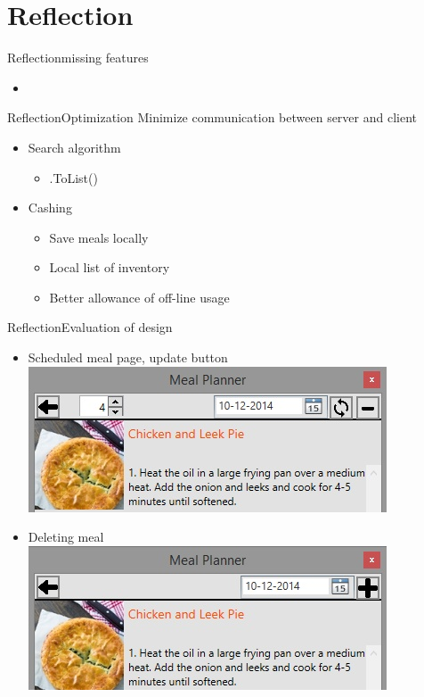 \section{Reflection}

\begin{frame}{Reflection}{missing features}%
	\begin{itemize}
		\item
	\end{itemize}
\end{frame}

\begin{frame}{Reflection}{Optimization}
	Minimize communication between server and client
	\begin{itemize}
		\item Search algorithm
		\begin{itemize}
			\item .ToList()
		\end{itemize}
		\item Cashing
		\begin{itemize}
			\item Save meals locally
			\item Local list of inventory
			\item Better allowance of off-line usage
		\end{itemize}
	\end{itemize}
\end{frame}

\begin{frame}{Reflection}{Evaluation of design}
	\begin{itemize}
		\item Scheduled meal page, update button
		\newline \includegraphics[scale=0.4]{./graphics/datepicker}
		\item Deleting meal
		\newline \includegraphics[scale=0.4]{./graphics/datepickerNotPlanned}
	\end{itemize}
\end{frame}

